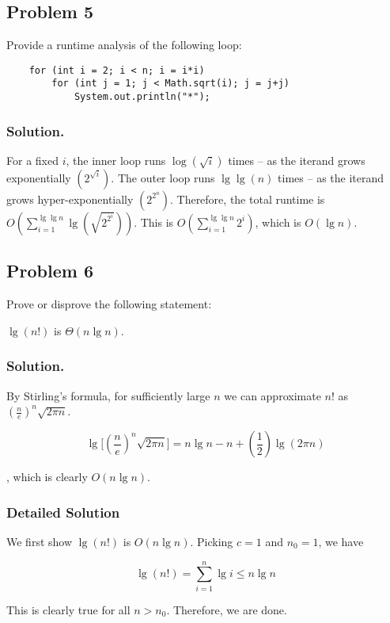 \subsection*{Problem 5}
Provide a runtime analysis of the following loop:

\begin{verbatim}
    for (int i = 2; i < n; i = i*i)
        for (int j = 1; j < Math.sqrt(i); j = j+j)
            System.out.println("*");
\end{verbatim}

\subsubsection*{Solution.}

For a fixed $i$, the inner loop runs $\log(\sqrt{i})$ times – as the iterand grows exponentially $(2^{\sqrt{i}})$. The outer loop runs $\lg \lg (n)$ times – as the iterand grows hyper-exponentially $(2^{2^n})$. Therefore, the total runtime is $O(\sum_{i=1}^{\lg\lg{n}} \lg(\sqrt{2^{2^i}}))$. This is $O(\sum_{i=1}^{\lg\lg n} 2^i)$, which is $O(\lg n)$.

\subsection*{Problem 6}
Prove or disprove the following statement:

\begin{center}
    $\lg(n!)$ is $\Theta(n\lg{n})$.
\end{center}

\subsubsection*{Solution.}
By Stirling's formula, for sufficiently large $n$ we can approximate $n!$ as $(\frac{n}{e})^n \sqrt{2\pi n}$.

$$\lg\bigg[(\frac{n}{e})^n \sqrt{2\pi n}\bigg] = n\lg n - n + (\frac{1}{2})\lg(2\pi n)$$

, which is clearly $O(n\lg n)$.

\subsubsection*{Detailed Solution}
We first show $\lg(n!)$ is $O(n\lg n)$. Picking $c=1$ and $n_0=1$, we have

$$\lg(n!) = \sum_{i=1}^n \lg i \leq n\lg n$$

This is clearly true for all $n > n_0$. Therefore, we are done.\\

